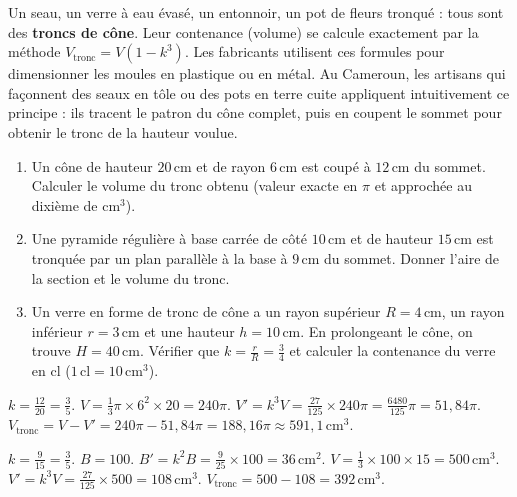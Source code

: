 \documentclass[11pt]{article}
\begin{document}
\begin{savaistu}
Un seau, un verre à eau évasé, un entonnoir, un pot de fleurs tronqué : tous sont des \textbf{troncs de cône}. Leur contenance (volume) se calcule exactement par la méthode $V_{\text{tronc}} = V(1-k^3)$. Les fabricants utilisent ces formules pour dimensionner les moules en plastique ou en métal. Au Cameroun, les artisans qui façonnent des seaux en tôle ou des pots en terre cuite appliquent intuitivement ce principe : ils tracent le patron du cône complet, puis en coupent le sommet pour obtenir le tronc de la hauteur voulue.
\end{savaistu}

\begin{exercice}[Entraînement]
\begin{enumerate}
  \item Un cône de hauteur $20\,\text{cm}$ et de rayon $6\,\text{cm}$ est coupé à $12\,\text{cm}$ du sommet. Calculer le volume du tronc obtenu (valeur exacte en $\pi$ et approchée au dixième de $\text{cm}^3$).
  \item Une pyramide régulière à base carrée de côté $10\,\text{cm}$ et de hauteur $15\,\text{cm}$ est tronquée par un plan parallèle à la base à $9\,\text{cm}$ du sommet. Donner l'aire de la section et le volume du tronc.
  \item Un verre en forme de tronc de cône a un rayon supérieur $R=4\,\text{cm}$, un rayon inférieur $r=3\,\text{cm}$ et une hauteur $h=10\,\text{cm}$. En prolongeant le cône, on trouve $H=40\,\text{cm}$. Vérifier que $k = \frac{r}{R} = \frac{3}{4}$ et calculer la contenance du verre en $\text{cl}$ ($1\,\text{cl}=10\,\text{cm}^3$).
\end{enumerate}
\end{exercice}

\begin{corrige}[Exercice 1]
$k = \frac{12}{20} = \frac{3}{5}$. $V = \frac{1}{3}\pi \times 6^2 \times 20 = 240\pi$. $V' = k^3 V = \frac{27}{125}\times 240\pi = \frac{6480}{125}\pi = 51,84\pi$. $V_{\text{tronc}} = V - V' = 240\pi - 51,84\pi = 188,16\pi \approx 591,1\,\text{cm}^3$.
\end{corrige}

\begin{corrige}[Exercice 2]
$k = \frac{9}{15} = \frac{3}{5}$. $B = 100$. $B' = k^2 B = \frac{9}{25}\times 100 = 36\,\text{cm}^2$. $V = \frac{1}{3}\times 100 \times 15 = 500\,\text{cm}^3$. $V' = k^3 V = \frac{27}{125}\times 500 = 108\,\text{cm}^3$. $V_{\text{tronc}} = 500-108 = 392\,\text{cm}^3$.
\end{corrige}
\end{document}
